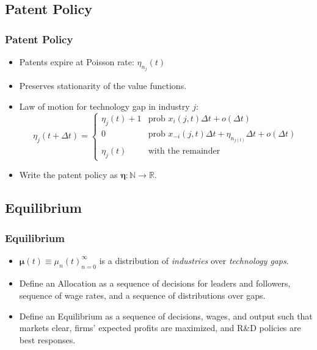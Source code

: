\documentclass{beamer}
\begin{document}
\subsection{Patent Policy}
\label{sub:patent_policy}

\begin{frame}[t]\frametitle{Patent Policy}
  \begin{itemize}
    \item<+-> Patents expire at Poisson rate: $\eta_{n_j}(t)$
    \item<+-> Preserves stationarity of the value functions.
    \item<+-> Law of motion for technology gap in industry $j$:
      \begin{equation*} \label{eq:tech_law_of_motion}
        \eta_j(t + \Delta t) =
        \begin{cases}
          \eta_j(t) + 1 & \textrm{prob } x_i(j,t)\Delta t + o(\Delta t)\\
          0 & \textrm{prob } x_{-i}(j,t)\Delta t + \eta_{n_{j(t)}}\Delta t + o(\Delta t) \\
          \eta_j(t) & \textrm{with the remainder} 
        \end{cases}
      \end{equation*}
  \item<+-> Write the patent policy as $\bm{\eta} : \mathbb{N} \rightarrow \mathbb{R}$.
  \end{itemize}
\end{frame}




\subsection{Equilibrium}
\label{sub:equilibrium}
\begin{frame}[t]\frametitle{Equilibrium} 
  \begin{itemize}

  \item<+-> $\bm{\mu}(t) \equiv {\mu_n(t)}_{n=0}^\infty$ is a distribution of \emph{industries} over \emph{technology gaps}.
  
  \item<+-> Define an \textsf{Allocation} as a sequence of decisions for leaders and followers, sequence of wage rates, and a sequence of distributions over gaps.

  \item<+-> Define an \textsf{Equilibrium} as a sequence of decisions, wages, and output such that markets clear, firms' expected profits are maximized, and R\&D policies are best responses. 

  \end{itemize}
\end{frame}
\end{document}
